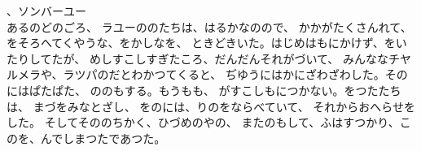 \documentclass[
a4paper,
fontsize=20pt,
jafontsize=20pt,
book]
{tarticle}
\begin{document}
、ソンバーユー\\

あるのどのごろ、
ラユーののたちは、はるかなのので、
かかがたくさんれて、をそろへてくやうな、をかしなを、
ときどきいた。はじめはもにかけず、をいたりしてたが、
めしすこしすぎたころ、だんだんそれがづいて、
みんななチヤルメラや、ラツパのだとわかつてくると、
ぢゆうにはかにざわざわした。そのにはぱたぱた、
ののもする。もうもも、
がすこしもにつかない。をつたたちは、
まづをみなとざし、
をのには、りのをならべていて、
それからおへらせをした。
そしてそののちかく、ひづめのやの、
またのもして、ふはすつかり、このを、んでしまつたであつた。
\end{document}
